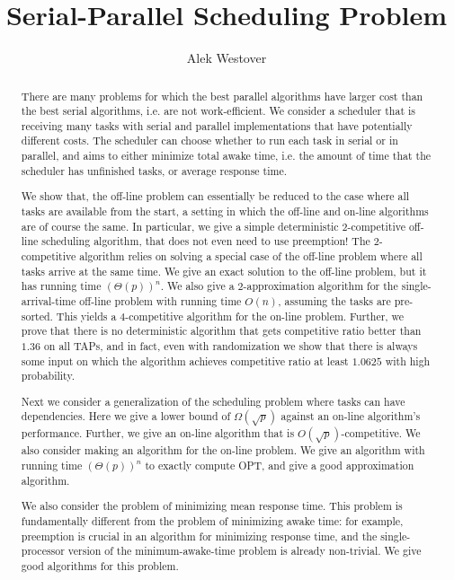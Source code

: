 \documentclass[twocolumn]{article}[10pt]
\author{Alek Westover}
\title{Serial-Parallel Scheduling Problem}
\begin{document}
\maketitle

\begin{abstract}
There are many problems for which the best parallel algorithms
have larger cost than the best serial algorithms, i.e. are not
work-efficient. We consider a scheduler that is receiving many
tasks with serial and parallel implementations that have
potentially different costs. The scheduler can choose whether to
run each task in serial or in parallel, and aims to either
minimize total awake time, i.e. the amount of time that the
scheduler has unfinished tasks, or average response time. 

We show that, the off-line problem can essentially be reduced to
the case where all tasks are available from the start, a setting
in which the off-line and on-line algorithms are of course the
same. In particular, we give a simple deterministic
$2$-competitive off-line scheduling algorithm, that does not even
need to use preemption! The $2$-competitive algorithm relies on
solving a special case of the off-line problem where all tasks
arrive at the same time. We give an exact solution to the
off-line problem, but it has running time $(\Theta(p))^n$. We also
give a $2$-approximation algorithm for the single-arrival-time
off-line problem with running time $O(n)$, assuming the tasks are
pre-sorted. This yields a $4$-competitive algorithm for the
on-line problem. Further, we prove that there is no deterministic
algorithm that gets competitive ratio better than $1.36$ on all
TAPs, and in fact, even with randomization we show that there is
always some input on which the algorithm achieves competitive
ratio at least $1.0625$ with high probability.

Next we consider a generalization of the scheduling problem where
tasks can have dependencies. Here we give a lower bound of
$\Omega(\sqrt{p})$ against an on-line algorithm's performance.
Further, we give an on-line algorithm that is
$O(\sqrt{p})$-competitive. We also consider making an algorithm
for the on-line problem. {\color{red}We give an algorithm with
  running time $(\Theta(p))^n$ to exactly compute OPT, and give a
good approximation algorithm.}

We also consider the problem of minimizing mean response time.
This problem is fundamentally different from the problem of
minimizing awake time: for example, preemption is crucial in an
algorithm for minimizing response time, and the single-processor
version of the minimum-awake-time problem is already non-trivial.
{\color{red}We give good algorithms for this problem.}

\end{abstract}









\end{document}

